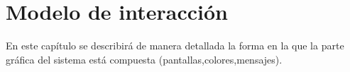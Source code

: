 
\chapter{Modelo de interacción}

	En este capítulo se describirá de manera detallada la forma en la que la parte gráfica del sistema está compuesta (pantallas,colores,mensajes).
	
	
	

